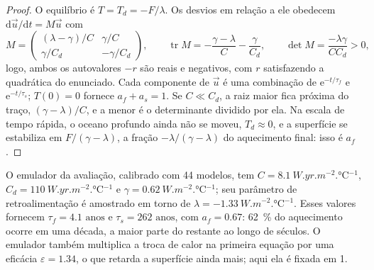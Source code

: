 \begin{proof}
O equilíbrio é $T = T_d = -F/\lambda$. Os desvios em relação a ele obedecem
$\mathrm d\vec u/\mathrm dt = M\vec u$ com
\[
M = \begin{pmatrix} (\lambda - \gamma)/C & \gamma/C\\ \gamma/C_d &
-\gamma/C_d\end{pmatrix}, \qquad
\operatorname{tr}M = -\frac{\gamma - \lambda}{C} - \frac{\gamma}{C_d},
\qquad \det M = \frac{-\lambda\gamma}{CC_d} > 0 ,
\]
logo, ambos os autovalores $-r$ são reais e negativos, com $r$ satisfazendo a quadrática
do enunciado. Cada componente de $\vec u$ é uma combinação de $\mathrm
e^{-t/\tau_f}$ e $\mathrm e^{-t/\tau_s}$; $T(0) = 0$ fornece $a_f + a_s =
1$. Se $C \ll C_d$, a raiz maior fica próxima do traço, $(\gamma -
\lambda)/C$, e a menor é o determinante dividido por ela. Na escala de tempo
rápida, o oceano profundo ainda não se moveu, $T_d \approx 0$, e a superfície
se estabiliza em $F/(\gamma - \lambda)$, a fração $-\lambda/(\gamma - \lambda)$
do aquecimento final: isso é $a_f$.
\end{proof}

O emulador da avaliação, calibrado com 44 modelos, tem $C =
\qty{8.1}{W.yr.m^{-2}.\celsius^{-1}}$, $C_d = \qty{110}{W.yr.m^{-2}.\celsius^{-1}}$
e $\gamma = \qty{0.62}{W.m^{-2}.\celsius^{-1}}$; seu parâmetro de retroalimentação é
amostrado em torno de $\lambda = \qty{-1.33}{W.m^{-2}.\celsius^{-1}}$. Esses valores
fornecem $\tau_f = \num{4.1}\text{ anos}$ e $\tau_s = \num{262}\text{ anos}$, com $a_f =
0.67$: \qty{62}{\percent} do aquecimento ocorre em uma década, a maior parte do
restante ao longo de séculos. O emulador também multiplica a troca de calor na primeira
equação por uma eficácia $\varepsilon = 1.34$, o que retarda a superfície
ainda mais; aqui ela é fixada em 1.


